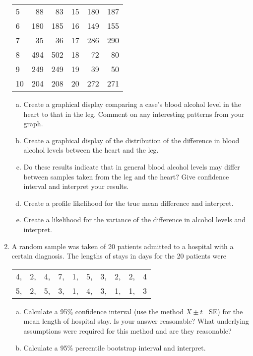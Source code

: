 \documentclass[12pt]{article}
\begin{document}
\begin{enumerate}[Problem 1.]
\begin{center}
\begin{tabular}{lrrrrr}
5 &  88 &  83  &  15 & 180 &  187 \\
6 & 180 &  185 &  16 & 149 &  155 \\
7 &  35 &   36 &  17 & 286 &  290 \\
8 & 494 &  502 &  18 &  72 &  80  \\
9 & 249 &  249 &  19 &  39 &  50  \\
10& 204 &  208 &  20 & 272 &  271 \\ \hline
\end{tabular}
\end{center}
\normalfont
\begin{enumerate}[a.]
\item Create a graphical display comparing a case's blood alcohol level in the heart to that in the leg.  Comment on any interesting patterns from your graph.
\item Create a graphical display of the distribution of the difference in blood alcohol levels between the heart and the leg.
\item Do these results indicate that in general blood alcohol levels may differ between samples taken from the leg and the heart? Give confidence interval and
  interpret your results.
\item Create a profile likelihood for the true mean difference and
  interpret.
\item Create a likelihood for the variance of the difference in
  alcohol levels and interpret.
\end{enumerate}
\item A random sample was taken of 20 patients admitted to a hospital
  with a certain diagnosis.  The lengths of stays in days for the 20
  patients were
\begin{center}
\begin{tabular}{cccccccccc}
 4, & 2, & 4, & 7, & 1, & 5, & 3, & 2, & 2, & 4 \vspace{+0.15in} \\
5, & 2, & 5, & 3, & 1, & 4, & 3, & 1, & 1, & 3
\end{tabular}
\end{center}
\begin{enumerate}[a.]
\item Calculate a 95\% confidence interval (use the method
$\overline{X} \pm t \;\;$ SE) for the mean length of hospital stay.  Is your answer reasonable? What underlying assumptions were required for this method and are they reasonable?
\item Calculate a 95\% percentile bootstrap interval and interpret.

\end{enumerate}
\end{enumerate}
\end{document}
